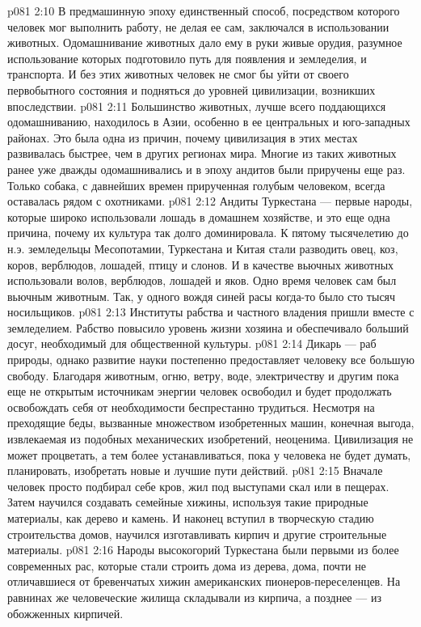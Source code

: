 \vs p081 2:10 \pc В предмашинную эпоху единственный способ, посредством которого человек мог выполнить работу, не делая ее сам, заключался в использовании животных. Одомашнивание животных дало ему в руки живые орудия, разумное использование которых подготовило путь для появления и земледелия, и транспорта. И без этих животных человек не смог бы уйти от своего первобытного состояния и подняться до уровней цивилизации, возникших впоследствии.
\vs p081 2:11 Большинство животных, лучше всего поддающихся одомашниванию, находилось в Азии, особенно в ее центральных и юго\hyp{}западных районах. Это была одна из причин, почему цивилизация в этих местах развивалась быстрее, чем в других регионах мира. Многие из таких животных ранее уже дважды одомашнивались и в эпоху андитов были приручены еще раз. Только собака, с давнейших времен прирученная голубым человеком, всегда оставалась рядом с охотниками.
\vs p081 2:12 Андиты Туркестана --- первые народы, которые широко использовали лошадь в домашнем хозяйстве, и это еще одна причина, почему их культура так долго доминировала. К пятому тысячелетию до н.э. земледельцы Месопотамии, Туркестана и Китая стали разводить овец, коз, коров, верблюдов, лошадей, птицу и слонов. И в качестве вьючных животных использовали волов, верблюдов, лошадей и яков. Одно время человек сам был вьючным животным. Так, у одного вождя синей расы когда\hyp{}то было сто тысяч носильщиков.
\vs p081 2:13 \pc Институты рабства и частного владения пришли вместе с земледелием. Рабство повысило уровень жизни хозяина и обеспечивало больший досуг, необходимый для общественной культуры.
\vs p081 2:14 Дикарь --- раб природы, однако развитие науки постепенно предоставляет человеку все большую свободу. Благодаря животным, огню, ветру, воде, электричеству и другим пока еще не открытым источникам энергии человек освободил и будет продолжать освобождать себя от необходимости беспрестанно трудиться. Несмотря на преходящие беды, вызванные множеством изобретенных машин, конечная выгода, извлекаемая из подобных механических изобретений, неоценима. Цивилизация не может процветать, а тем более устанавливаться, пока у человека не будет  думать, планировать, изобретать новые и лучшие пути действий.
\vs p081 2:15 \pc Вначале человек просто подбирал себе кров, жил под выступами скал или в пещерах. Затем научился создавать семейные хижины, используя такие природные материалы, как дерево и камень. И наконец вступил в творческую стадию строительства домов, научился изготавливать кирпич и другие строительные материалы.
\vs p081 2:16 Народы высокогорий Туркестана были первыми из более современных рас, которые стали строить дома из дерева, дома, почти не отличавшиеся от бревенчатых хижин американских пионеров\hyp{}переселенцев. На равнинах же человеческие жилища складывали из кирпича, а позднее --- из обожженных кирпичей.
